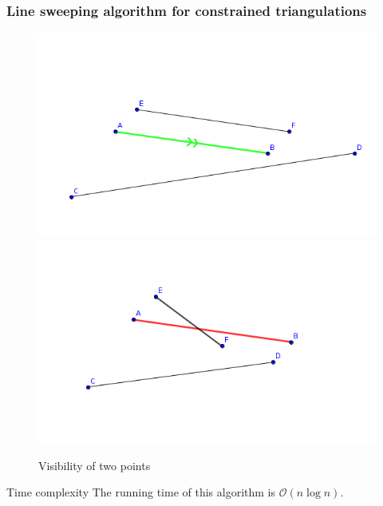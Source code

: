 \documentclass[10pt]{beamer}
\begin{document}
\begin{frame}
\frametitle{Line sweeping algorithm for constrained triangulations}
\begin{figure}[H]
	
	\includegraphics[scale=.25]{Visibility}
	\includegraphics[scale=.25]{non-visibility}
	
	\caption{Visibility of two points}
	\label{fig:visibility}
\end{figure}
\begin{block}{Time complexity}
	The running time of this algorithm is $\mathcal{O}(n\log n)$.
\end{block}		
\end{frame}
\end{document}
